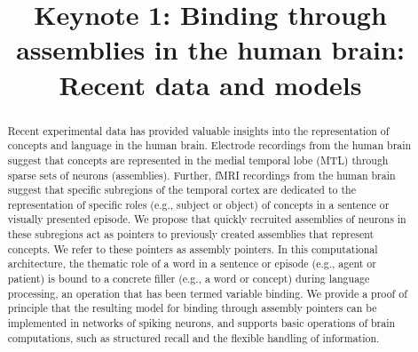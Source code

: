 \documentclass{article}
\title{Keynote 1: Binding through assemblies in the human brain: Recent data and models}
\begin{document}
\maketitle
\thispagestyle{empty}
\begin{abstract}
Recent experimental data has provided valuable insights into the representation of concepts and language in the human brain. Electrode recordings from the human brain suggest that concepts are represented in the medial temporal lobe (MTL) through sparse sets of neurons (assemblies). Further, fMRI recordings from the human brain suggest that specific subregions of the temporal cortex are dedicated to the representation of specific roles (e.g., subject or object) of concepts in a sentence or visually presented episode. We propose that quickly recruited assemblies of neurons in these subregions act as pointers  to previously created assemblies that represent concepts. We refer to these pointers as assembly pointers. In this computational architecture, the thematic role of a word in a sentence or episode (e.g., agent or patient) is bound to a concrete filler (e.g., a word or concept) during language processing, an operation that has been termed variable binding. We provide a proof of principle that the resulting model for binding through assembly pointers can be implemented in networks of spiking neurons, and supports basic operations of brain computations, such as structured recall and the flexible handling of information.
\end{abstract}
\vfill{}
\end{document}

